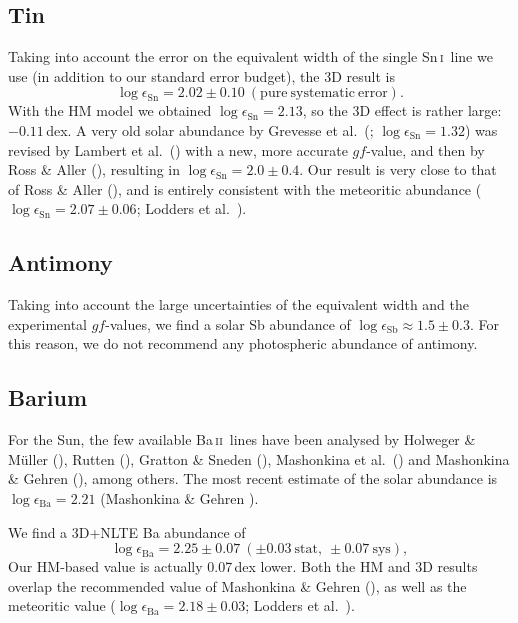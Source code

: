 \documentclass[traditabstract]{aa}
\newcommand{\altsni}{Sn\,\textsc{i}}
\newcommand{\altbaii}{Ba\,\textsc{ii}}
\newcommand{\sni}{\altsni\ }
\newcommand{\baii}{\altbaii\ }
\begin{document}
\subsection{Tin}
Taking into account the error on the equivalent width of the single \sni line we use (in addition to our standard error budget), the 3D result is
\begin{displaymath}
\log\epsilon_{\mathrm{Sn}}=2.02\pm0.10\ \mathrm{(pure\ systematic\ error)}.
\end{displaymath}
With the HM model we obtained $\log\epsilon_{\mathrm{Sn}}=2.13$, so the 3D effect is rather large: $-0.11$\,dex.  A very old solar abundance by Grevesse et al.\ (\cite{grev2}; $\log\epsilon_{\mathrm{Sn}}=1.32$) was revised by Lambert et al.\ (\cite{lamb}) with a new, more accurate $gf$-value, and then by Ross \& Aller (\cite{ross3}), resulting in $\log\epsilon_{\mathrm{Sn}}=2.0\pm0.4$.  Our result is very close to that of Ross \& Aller (\cite{ross3}), and is entirely consistent with the meteoritic abundance ($\log \epsilon_{\mathrm{Sn}}=2.07\pm0.06$; Lodders et al.\ \cite{lodd}).

\subsection{Antimony}
Taking into account the large uncertainties of the equivalent width and the experimental $gf$-values, 
we find a solar Sb abundance of $\log\epsilon_{\mathrm{Sb}}\approx1.5\pm0.3$. For
this reason, we do not recommend any photospheric abundance of antimony.

\subsection{Barium}
For the Sun, the few available \baii lines have been analysed by Holweger \& M\"uller (\cite{hol}), Rutten (\cite{rutt}), Gratton \& Sneden (\cite{grat}), Mashonkina et al.\ (\cite{mash3}) and Mashonkina \& Gehren (\cite{mash2}), among others.  The most recent estimate of the solar abundance is $\log\epsilon_{\mathrm{Ba}}=2.21$ (Mashonkina \& Gehren \cite{mash2}).

We find a 3D+NLTE Ba abundance of
\begin{displaymath}
\log\epsilon_{\mathrm{Ba}}=2.25\pm0.07\ (\pm0.03\ \mathrm{stat},\ \pm0.07\ \mathrm{sys}),
\end{displaymath}
Our HM-based value is actually 0.07\,dex lower. Both the HM and 3D results overlap the recommended value of Mashonkina \& Gehren (\cite{mash2}), as well as the meteoritic value ($\log \epsilon_{\mathrm{Ba}}=2.18\pm0.03$; Lodders et al.\ \cite{lodd}).
 
\end{document}

